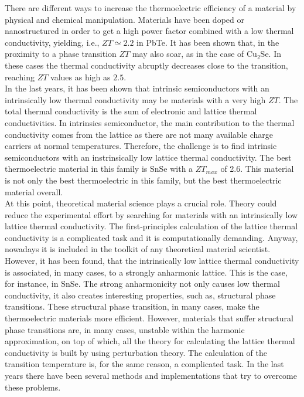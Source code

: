 There are different ways to increase the thermoelectric efficiency of a material by physical and chemical 
manipulation. Materials have been doped\cite{kim2013engineered,pei2011stabilizing,heremans2008enhancement} or
nanostructured\cite{vineis2010nanostructured,minnich2009bulk} in order to get a high power factor combined with a 
low thermal conductivity, yielding, i.e., $ZT\simeq 2.2$ in PbTe\cite{hsu2004cubic}. It has been shown that, in the 
proximity to a phase transition $ZT$ may also soar, as in the case of Cu$_{2}$Se\cite{liu2013ultrahigh}. In these 
cases the thermal conductivity abruptly decreases close to the transition, reaching $ZT$ values as high as $2.5$. \\

In the last years, it has been shown that intrinsic semiconductors with an intrinsically low thermal conductivity 
may be materials with a very high $ZT$\cite{zhao2014ultralow,he2018remarkable}. The total thermal conductivity is 
the sum of electronic and lattice thermal conductivities. In intrinsics semiconductor, the main contribution to the 
thermal conductivity comes from the lattice as there are not many available charge carriers at normal temperatures. 
Therefore, the challenge is to find intrinsic semiconductors with an instrinsically low lattice thermal conductivity. 
The best thermoelectric material in this family is SnSe\cite{zhao2014ultralow} with a $ZT_{max}$ of 2.6. This 
material is not only the best thermoelectric in this family, but the best thermoelectric material overall. \\

At this point, theoretical material science plays a crucial role. Theory could reduce the experimental effort by 
searching for materials with an intrinsically low lattice thermal conductivity. The first-principles calculation of 
the lattice thermal conductivity is a complicated task and it is computationally demanding\cite{broido2007intrinsic}. 
Anyway, nowadays it is included in the toolkit\cite{giannozzi2009quantum} of any theoretical material scientist. 
However, it has been found, that the intrinsically low lattice thermal conductivity is associated, in many cases, to 
a strongly anharmonic lattice\cite{zhao2014ultralow,ribeiro2018strong}. This is the case, for instance, in SnSe. The 
strong anharmonicity not only causes low thermal conductivity, it also creates interesting properties, such as, 
structural phase transitions. These structural phase transition, in many cases, make the thermoelectric materials 
more efficient\cite{liu2013ultrahigh}. However, materials that suffer structural phase transitions are, in many 
cases, unstable within the harmonic approximation, on top of which, all the theory for calculating the 
lattice thermal conductivity is built by using perturbation theory\cite{paulatto2013anharmonic}. The calculation of 
the transition temperature is, for the same reason, a complicated task. In the last years there have been several 
methods and implementations\cite{hellman2013temperature,ljungberg2013temperature,magduau2013identification} that try 
to overcome these problems. \\

